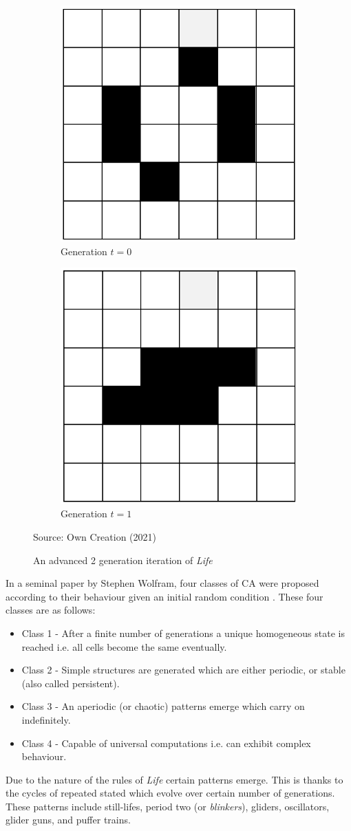 \begin{figure}[H]
\centering
\begin{subfigure}{.5\textwidth}
  \centering
  \includegraphics[width=.4\linewidth]{Figures/Chapter2/toad1.png}
  \caption{Generation $t = 0$}
\end{subfigure}%
\begin{subfigure}{.5\textwidth}
  \centering
  \includegraphics[width=.4\linewidth]{Figures/Chapter2/toad2.png}
  \caption{Generation $t = 1$}
\end{subfigure}
\caption{An advanced 2 generation iteration of \textsl{Life}}
\begin{center}
Source: Own Creation (2021)
\end{center}
\end{figure}
In a seminal paper by Stephen Wolfram, four classes of CA were proposed according to their behaviour given an initial random condition .\citep{Wolfram1984} These four classes are as follows:
\begin{itemize}
\item Class 1 - After a finite number of generations a unique homogeneous state is reached i.e. all cells become the same eventually.
\item Class 2 - Simple structures are generated which are either periodic, or stable (also called persistent).
\item Class 3 - An aperiodic (or chaotic) patterns emerge which carry on indefinitely.
\item Class 4 - Capable of universal computations i.e. can exhibit complex behaviour. 
\end{itemize}
Due to the nature of the rules of \textsl{Life} certain patterns emerge. This is thanks to the cycles of repeated stated which evolve over certain number of generations. These patterns include still-lifes, period two (or \textsl{blinkers}), gliders, oscillators, glider guns, and puffer trains.\citep{adamatzky2010game}

